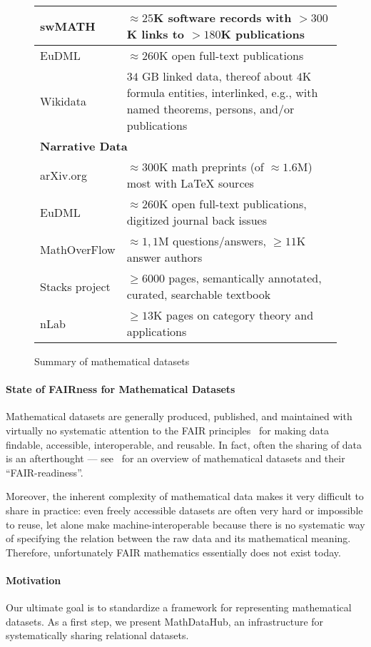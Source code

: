 \begin{figure*}[htp]
\begin{tabular}{| p{} | p{}|}
  swMATH \cite{swMATH:on} & $\approx 25$K software records with $> 300$K links to $> 180$K publications \\\hline
  EuDML  \cite{EuDML:on} & $\approx 260$K open full-text publications \\\hline
  Wikidata  \cite{wikidata:on} & $34$ GB linked data, thereof about $4$K formula entities, interlinked, e.g., with named theorems, persons, and/or publications \\\hline
  \multicolumn{2}{|l|}{\textbf{Narrative Data}} \\\hline
  arXiv.org & $\approx 300$K math preprints (of $\approx1.6$M) most with {\LaTeX} sources\\\hline
  EuDML  \cite{EuDML:on} & $\approx 260$K open full-text publications, digitized journal back issues \\\hline
  MathOverFlow & $\approx 1,1$M questions/answers, $\geq11$K answer authors \\\hline
  Stacks project & $\geq 6000$ pages, semantically annotated, curated, searchable textbook \\\hline
  nLab & $\geq 13$K pages on category theory and applications\\\hline
\end{tabular}
  \caption{Summary of mathematical datasets}\label{fig:datasets}
\end{figure*}

\paragraph{State of FAIRness for Mathematical Datasets}
Mathematical datasets are generally produced, published, and maintained with virtually no systematic attention to the FAIR principles~\cite{FAIR,WilDumAal:FAIR16} for making data findable, accessible, interoperable, and reusable.
In fact, often the sharing of data is an afterthought --- see~\cite{Bercic:cmo:wiki} for an overview of mathematical datasets and their ``FAIR-readiness''.

Moreover, the inherent complexity of mathematical data makes it very difficult to share in practice: even freely accessible datasets are often very hard or impossible to reuse, let alone make machine-interoperable because there is no systematic way of specifying the relation between the raw data and its mathematical meaning.  Therefore, unfortunately FAIR mathematics essentially does not exist today.

\paragraph{Motivation}
Our ultimate goal is to standardize a framework for representing mathematical datasets.
As a first step, we present MathDataHub, an infrastructure for systematically sharing relational datasets.

